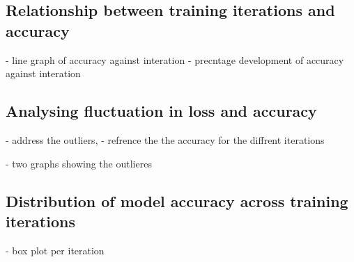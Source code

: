 \subsection{Relationship between training iterations and accuracy}
- line graph of accuracy against interation
- precntage development of accuracy against interation


\subsection{Analysing fluctuation in loss and accuracy}
- address the outliers, 
- refrence the the accuracy for the diffrent iterations 

- two graphs showing the outlieres

\subsection{Distribution of model accuracy across training iterations}
- box plot per iteration 





